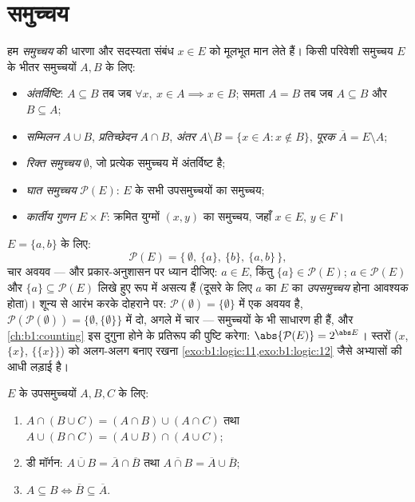 \section{समुच्चय}

\begin{definition}[समुच्चय पर संक्रियाएँ]\label{def:b1:logic:sets}
हम \emph{समुच्चय} की धारणा और सदस्यता संबंध $x \in E$ को
मूलभूत मान लेते हैं। किसी परिवेशी समुच्चय $E$ के भीतर समुच्चयों $A, B$ के
लिए:
\begin{itemize}
  \item \emph{अंतर्विष्टि}: $A \subseteq B$ तब जब $\forall x,\ x \in A
  \implies x \in B$; समता $A = B$ तब जब $A \subseteq B$ और $B \subseteq A$;
  \item \emph{सम्मिलन} $A \cup B$, \emph{प्रतिच्छेदन} $A \cap B$,
  \emph{अंतर} $A \setminus B = \{x \in A : x \notin B\}$, \emph{पूरक}
  $\overline{A} = E \setminus A$;
  \item \emph{रिक्त समुच्चय} $\emptyset$, जो प्रत्येक समुच्चय में अंतर्विष्ट
  है;
  \item \emph{घात समुच्चय} $\mathcal{P}(E)$: $E$ के सभी
  उपसमुच्चयों का समुच्चय;
  \item \emph{कार्तीय गुणन} $E \times F$: क्रमित युग्मों $(x, y)$ का
  समुच्चय, जहाँ $x \in E$, $y \in F$।
\end{itemize}
\end{definition}

\begin{example}[घात समुच्चय से परिचय]\label{ex:b1:logic:powerset}
$E = \{a, b\}$ के लिए:
\[
\mathcal P(E) = \bigl\{\, \emptyset,\ \{a\},\ \{b\},\ \{a, b\}
\,\bigr\},
\]
चार अवयव --- और प्रकार-अनुशासन पर ध्यान दीजिए: $a \in E$, किंतु $\{a\} \in
\mathcal P(E)$;  $a \in \mathcal P(E)$ और $\{a\} \subseteq \mathcal P(E)$
लिखे हुए रूप में असत्य हैं (दूसरे के लिए $a$ का $E$ का \emph{उपसमुच्चय} होना
आवश्यक होता)। शून्य से आरंभ करके दोहराने पर: $\mathcal P(\emptyset) =
\{\emptyset\}$ में एक अवयव है, $\mathcal P(\mathcal P(\emptyset)) =
\{\emptyset, \{\emptyset\}\}$ में दो, अगले में चार --- समुच्चयों के 
भी साधारण  ही हैं, और \cref{ch:b1:counting} इस दुगुना होने के
प्रतिरूप की पुष्टि करेगा: $\abs{\mathcal P(E)} = 2^{\abs E}$। स्तरों ($x$,
$\{x\}$, $\{\{x\}\}$) को अलग-अलग बनाए रखना
\cref{exo:b1:logic:11,exo:b1:logic:12} जैसे अभ्यासों की आधी लड़ाई है।
\end{example}

\begin{proposition}[समुच्चय बीजगणित]\label{prop:b1:logic:setalgebra}
$E$ के उपसमुच्चयों $A, B, C$ के लिए:
\begin{enumerate}
  \item $A \cap (B \cup C) = (A \cap B) \cup (A \cap C)$ तथा $A \cup (B \cap
  C) = (A \cup B) \cap (A \cup C)$;
  \item डी मॉर्गन: $\overline{A \cup B} = \overline{A} \cap \overline{B}$
  तथा $\overline{A \cap B} = \overline{A} \cup \overline{B}$;
  \item $A \subseteq B \iff \overline{B} \subseteq \overline{A}$.
\end{enumerate}
\end{proposition}

